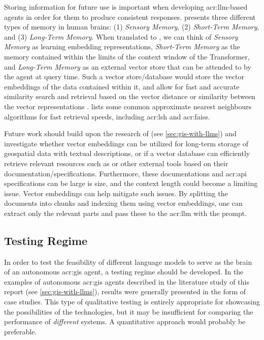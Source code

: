Storing information for future use is important when developing \acrshort{acr:llm}-based agents in order for them to produce consistent responses. \cite{wengLLMPoweredAutonomous2023} presents three different types of memory in human brains: (1) \textit{Sensory Memory}, (2) \textit{Short-Term Memory}, and (3) \textit{Long-Term Memory}. When translated to , we can think of \textit{Sensory Memory} as learning embedding representations, \textit{Short-Term Memory} as the memory contained within the limits of the context window of the Transformer, and  \textit{Long-Term Memory} as an external vector store that can be attended to by the agent at query time. Such a vector store/database would store the vector embeddings of the data contained within it, and allow for fast and accurate similarity search and retrieval based on the vector distance or similarity between the vector representations \citep{evchakiVectorDatabase2023}. \cite{wengLLMPoweredAutonomous2023} lists some common approximate nearest neighbours algorithms for fast retrieval speeds, including \gls{acr:lsh} and \gls{acr:faiss}.

Future work should build upon the research of \cite{unluChatmapLargeLanguage2023} (see \autoref{sec:gis-with-llms}) and investigate whether vector embeddings can be utilized for long-term storage of geospatial data with textual descriptions, or if a vector database can efficiently retrieve relevant resources such as  or other external tools based on their documentation/specifications. Furthermore, these documentations and \acrshort{acr:api} specifications can be large is size, and the context length could become a limiting issue. Vector embeddings can help mitigate such issues. By splitting the documents into chunks and indexing them using vector embeddings, one can extract only the relevant parts and pass these to the \acrshort{acr:llm} with the prompt.

\subsection{Testing Regime}\label{subsec:testing-regime}

In order to test the feasibility of different language models to serve as the brain of an autonomous \acrshort{acr:gis} agent, a testing regime should be developed. In the examples of autonomous \acrshort{acr:gis} agents described in the literature study of this report (see \autoref{sec:gis-with-llms}), results were generally presented in the form of case studies. This type of qualitative testing is entirely appropriate for showcasing the possibilities of the technologies, but it may be insufficient for comparing the performance of \textit{different} systems. A quantitative approach would probably be preferable.

